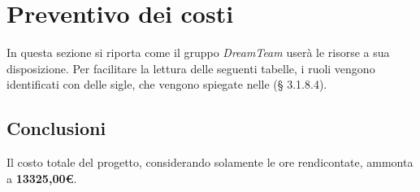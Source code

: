 \section{Preventivo dei costi}
In questa sezione si riporta come il gruppo \textit{DreamTeam} userà le risorse a sua disposizione. Per facilitare la lettura delle seguenti tabelle, i ruoli vengono identificati con delle sigle, che vengono spiegate nelle \textit{\NdP} (§ 3.1.8.4).


\pagebreak

\pagebreak

\pagebreak

\pagebreak


\subsection{Conclusioni}
Il costo totale del progetto, considerando solamente le ore rendicontate, ammonta a \textbf{13325,00\euro}.

\pagebreak